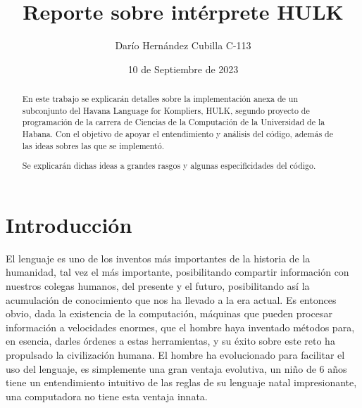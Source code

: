 \documentclass{article}
\begin{document}
\title{Reporte sobre intérprete HULK}
\author{Darío Hernández Cubilla C-113}
\date{10 de Septiembre de 2023}
\maketitle

\tableofcontents

\begin{abstract}
    En este trabajo se explicarán detalles sobre la implementación anexa de un subconjunto
    del Havana Language for Kompliers, HULK, segundo proyecto de programación de la carrera
    de Ciencias de la Computación de la Universidad de la Habana. Con el objetivo de apoyar 
    el entendimiento y análisis del código, además de las ideas sobres las que se implementó.

    Se explicarán dichas ideas a grandes rasgos y algunas especificidades del código.
\end{abstract}

\newpage

\section*{Introducción}
El lenguaje es uno de los inventos más importantes de la historia de la humanidad, tal vez el más importante, posibilitando compartir información con nuestros colegas humanos, del presente y el futuro, posibilitando así la acumulación de conocimiento que nos ha llevado a la era actual. Es entonces obvio, dada la existencia de la computación, máquinas que pueden procesar información a velocidades enormes, que el hombre haya inventado métodos para, en esencia, darles órdenes a estas herramientas, y su éxito sobre este reto ha propulsado la civilización humana. El hombre ha evolucionado para facilitar el uso del lenguaje, es simplemente una gran ventaja evolutiva, un niño de 6 años tiene un entendimiento intuitivo de las reglas de su lenguaje natal impresionante, una computadora no tiene esta ventaja innata.
\end{document}

